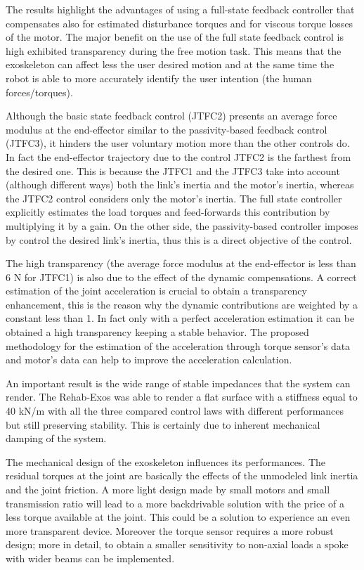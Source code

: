 \documentclass[journal]{IEEEtran}
\begin{document}
The results highlight the advantages of using a full-state feedback controller that compensates also for estimated disturbance torques and for viscous torque losses of the motor. The major benefit on the use of the full state feedback control is high exhibited transparency during the free motion task. This means that the exoskeleton can affect less the user desired motion and at the same time the robot is able to more accurately identify the user intention (the human forces/torques).
\par Although the basic state feedback control (JTFC2) presents an average force modulus at the end-effector similar to the passivity-based feedback control (JTFC3), it hinders the user voluntary motion more than the other controls do. In fact the end-effector trajectory due to the control JTFC2 is the farthest from the desired one. This is because the JTFC1 and the JTFC3 take into account (although different ways) both the link's inertia and the motor's inertia, whereas the JTFC2 control considers only the motor's inertia. The full state controller explicitly estimates the load torques and feed-forwards this contribution by multiplying it by a gain. On the other side, the passivity-based controller imposes by control the desired link's inertia, thus this is a direct objective of the control.
\par The high transparency (the average force modulus at the end-effector is less than 6 N for JTFC1) is also due to the effect of the dynamic compensations. A correct estimation of the joint acceleration is crucial to obtain a transparency enhancement, this is the reason why the dynamic contributions are weighted by a constant less than 1. In fact only with a perfect acceleration estimation it can be obtained a high transparency keeping a stable behavior. The proposed methodology for the estimation of the acceleration through torque sensor's data and motor's data can help to improve the acceleration calculation.
\par An important result is the wide range of stable impedances that the system can render. The Rehab-Exos was able to render a flat surface with a stiffness equal to 40 kN/m with all the three compared control laws with different performances but still preserving stability. This is certainly due to inherent mechanical damping of the system.
\par The mechanical design of the exoskeleton influences its performances. The residual torques at the joint are basically the effects of the unmodeled link inertia and the joint friction. A more light design made by small motors and small transmission ratio will lead to a more backdrivable solution with the price of a less torque available at the joint. This could be a solution to experience an even more transparent device. Moreover the torque sensor requires a more robust design; more in detail, to obtain a smaller sensitivity to non-axial loads a spoke with wider beams can be implemented.
\end{document}
